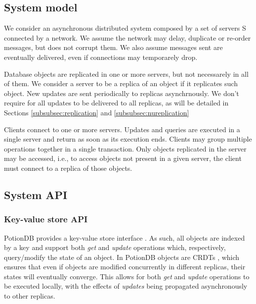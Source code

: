 \documentclass{vldb}
\begin{document}
\subsection{System model}

We consider an asynchronous distributed system composed by a set of servers S connected by a network. 
We assume the network may delay, duplicate or re-order messages, but does not corrupt them. 
We also assume messages sent are eventually delivered, even if connections may temporarely drop.

Database objects are replicated in one or more servers, but not necessarely in all of them.  
We consider a server to be a replica of an object if it replicates such object. 
New updates are sent periodically to replicas asynchrnously. 
We don't require for all updates to be delivered to all replicas, as will be detailed in Sections \ref{subsubsec:replication} and \ref{subsubsec:nureplication}

Clients connect to one or more servers. 
Updates and queries are executed in a single server and return as soon as its execution ends.
Clients may group multiple operations together in a single transaction.
Only objects replicated in the server may be accessed, i.e., to access objects not present in a given server, the client must connect to a replica of those objects.

\subsection{System API}

\subsubsection{Key-value store API}

PotionDB provides a key-value store interface \cite{???}.
As such, all objects are indexed by a key and support both \emph{get} and \emph{update} operations which, respectively, query/modify the state of an object.
In PotionDB objects are CRDTs \cite{???}, which ensures that even if objects are modified concurrently in different replicas, their states will eventually converge.
This allows for both \emph{get} and \emph{update} operations to be executed locally, with the effects of \emph{updates} being propagated asynchronously to other replicas.
\end{document}
